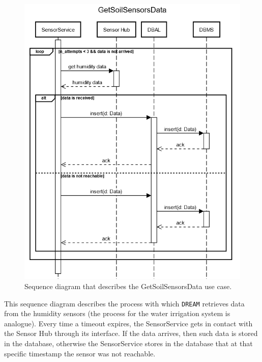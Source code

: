 \documentclass{article}
\begin{document}
\newpage
\begin{figure}[H]
   \centering
   \includegraphics[scale=0.60]{diagrams/sequence diagrams/GetSoilSensorsData.png}
    \caption{Sequence diagram that describes the GetSoilSensorsData use case.}
\end{figure}
This sequence diagram describes the process with which \verb|DREAM| retrieves data from the humidity sensors (the process for the water irrigation system is analogue). Every time a timeout expires, the SensorService gets in contact with the Sensor Hub through its interface. If the data arrives, then such data is stored in the database, otherwise the SensorService stores in the database that at that specific timestamp the sensor was not reachable.
\end{document}
